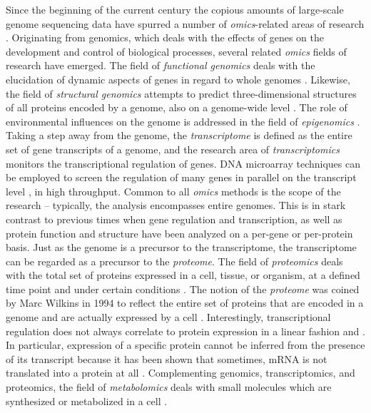 Since the beginning of the current century the copious amounts of large-scale 
genome sequencing data have spurred a number of {\em omics}-related areas of 
research \citep{Sauer2007, Colquhoun2005}.
Originating from genomics, which deals with the effects of genes on the 
development and control of biological processes, several related {\em omics} 
fields of research have emerged.
The field of {\em functional
genomics} deals with the elucidation of dynamic aspects of genes in regard
to whole genomes \citep{Hieter1997}.
Likewise, the field of {\em structural genomics} attempts to predict 
three-dimensional structures of all proteins encoded by a genome, also on
a genome-wide level \citep{Baker2001a}.
The role of environmental influences on the genome is addressed in the field
of {\em epigenomics} \citep{Jirtle2007}.
Taking a step away from the genome, the {\em transcriptome} is defined as the 
entire set of gene transcripts of a genome, and the research area of 
{\em transcriptomics} monitors the transcriptional regulation of genes.
DNA microarray techniques can be employed to screen the regulation of many
genes in parallel on the transcript level \citep{Schena1995}, in high throughput.
Common to all {\em omics} methods is the scope of the research -- typically, the 
analysis encompasses entire genomes.
This is in stark contrast to previous times when gene regulation and 
transcription, as well as protein function and structure have been analyzed on 
a per-gene or per-protein basis.
Just as the genome is a precursor to the transcriptome, the transcriptome can
be regarded as a precursor to the {\em proteome}.
The field of {\em proteomics} deals with the total set of proteins expressed in 
a cell, tissue, or organism, at a defined time point and under certain 
conditions \citep{Yarmush2002, Yates2009}.
The notion of the {\em proteome} was coined by Marc Wilkins in 1994 
to reflect the entire set of proteins that are encoded in a genome and are 
actually expressed by a cell \citep{Wilkins2009}.
Interestingly, transcriptional regulation does not always correlate to
protein expression in a linear fashion and \citep{Rogers2008}.
In particular, expression of a specific protein cannot be inferred from the 
presence of its transcript because it has been shown that sometimes, mRNA 
is not translated into a protein at all \citep{Eddy2001}.
Complementing genomics, transcriptomics, and proteomics, the field of
{\em metabolomics} deals with small molecules which are synthesized or
metabolized in a cell \citep{Kell2004}.

